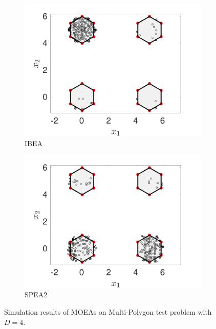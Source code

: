 \documentclass[conference]{IEEEtran}
\begin{document}
\begin{figure}[htbp]
    \begin{subfigure}[b]{.22\textwidth}
    \includegraphics[width=\linewidth]{Section5/dim4/PS/IBEA}
    \caption{IBEA}
    \end{subfigure}
    \begin{subfigure}[b]{.22\textwidth}
    \includegraphics[width=\linewidth]{Section5/dim4/PS/SPEA2}
    \caption{SPEA2}
    \end{subfigure}
    \caption{Simulation results of MOEAs on Multi-Polygon test problem with $D=4$.}
    \label{fig: MOEAs PS dim=4}
\end{figure}
\end{document}
